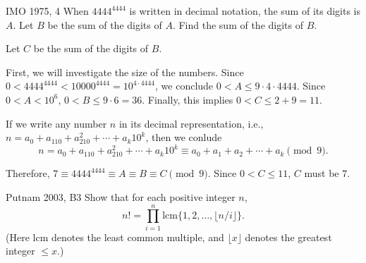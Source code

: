 
\begin{prob}{IMO 1975, 4}{}
	When \(4444^{4444}\) is written in decimal notation, the sum of its digits is \(A\).  Let \(B\) be the sum of the digits of \(A\). Find the sum of the digits of \(B\).
\end{prob}

\begin{sol}{}{}
	Let \(C\) be the sum of the digits of \(B\).

	First, we will investigate the size of the numbers.
	Since \(0 < 4444^{4444} < 10000^{4444} = 10^{4\cdot4444}\), we conclude \(0 < A \leq 9 \cdot 4 \cdot 4444\). Since \(0 < A < 10^6\), \(0 < B \leq 9 \cdot 6 = 36\). Finally, this implies \(0 < C \leq 2 + 9 = 11\).

	If we write any number \(n\) in its decimal representation, i.e., \(n = a_0 + a_110 + a_210^2 + \cdots + a_k10^k\), then we conlude \[
		n = a_0 + a_110 + a_210^2 + \cdots + a_k10^k \equiv a_0 + a_1 + a_2 + \cdots + a_k \pmod{9}.
	\]

	Therefore, \(7 \equiv 4444^{4444} \equiv A \equiv B \equiv C \pmod{9}\). Since \(0 < C \leq 11\), \(C\) must be \(7\).
\end{sol}

\begin{prob}{Putnam 2003, B3}{}
	Show that for each positive integer $n$, \[
		n! = \prod_{i=1}^n  \mathrm{lcm}\{1, 2, \dots, \lfloor n/i\rfloor\} .
	\] (Here $\mathrm{lcm}$ denotes the least common multiple, and
	$\lfloor x \rfloor$ denotes the greatest integer $\leq x$.)
\end{prob}

